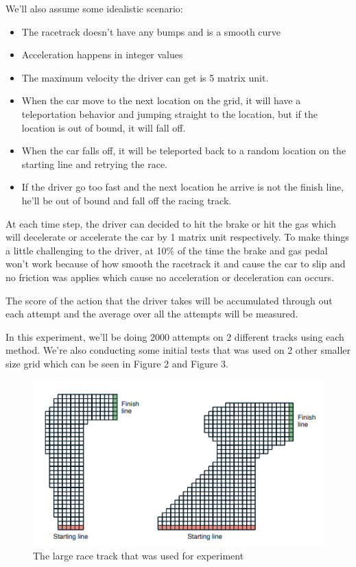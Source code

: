 \documentclass{article}
\begin{document}
We'll also assume some idealistic scenario:
\begin{itemize}
  \item The racetrack doesn't have any bumps and is a smooth curve
  \item Acceleration happens in integer values
  \item The maximum velocity the driver can get is 5 matrix unit.
  \item When the car move to the next location on the grid, it will have a
    teleportation behavior and jumping straight to the location, but if the
    location is out of bound, it will fall off.
  \item When the car falls off, it will be teleported back to a random location
    on the starting line and retrying the race.
  \item If the driver go too fast and the next location he arrive is not the
    finish line, he'll be out of bound and fall off the racing track.
\end{itemize}

At each time step, the driver can decided to hit the brake or hit the gas which
will decelerate or accelerate the car by 1 matrix unit respectively. 
To make things a little challenging to the driver, at 10\% of the time the brake and gas pedal won't work 
because of how smooth the racetrack it and cause the car to slip and no friction
was applies which cause no acceleration or deceleration can occurs.

The score of the action that the driver takes will be accumulated through out
each attempt and the average over all the attempts will be measured.

In this experiment, we'll be doing 2000 attempts on 2 different tracks using
each method. We're also conducting some initial tests that was used on 2 other
smaller size grid which can be seen in Figure 2 and Figure 3.

\begin{figure}[h!]
\centering
\includegraphics[scale=0.9]{./images/book-race-track.png}
\caption{The large race track that was used for experiment}
\label{fig:book-race-track}
\end{figure}
\end{document}
